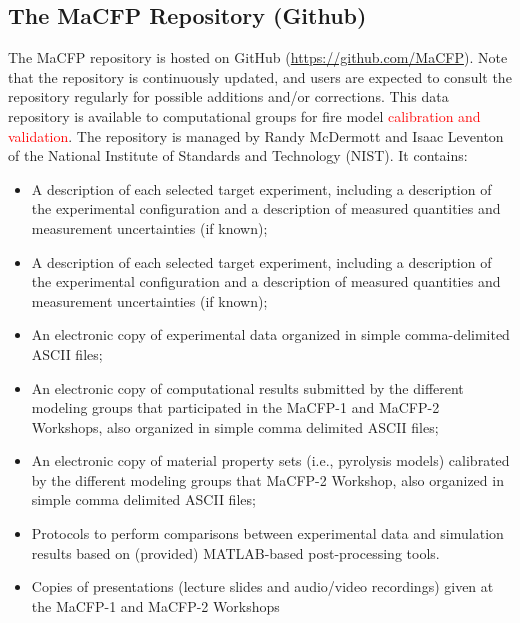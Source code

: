 \documentclass[12pt]{article}
\begin{document}
\subsection{The MaCFP Repository (Github)}
The MaCFP repository is hosted on GitHub (\url{https://github.com/MaCFP}). Note that the repository is continuously updated, and users are expected to consult the repository regularly for possible additions and/or corrections. This data repository is available to computational groups for fire model \textcolor{red}{calibration and validation}. The repository is managed by Randy McDermott and Isaac Leventon of the National Institute of Standards and Technology (NIST). It contains: 
\begin{itemize}[noitemsep]
 \item A description of each selected target experiment, including a description of the experimental configuration and a description of measured quantities and measurement uncertainties (if known); 
  \item A description of each selected target experiment, including a description of the experimental configuration and a description of measured quantities and measurement uncertainties (if known);  
 \item An electronic copy of experimental data organized in simple comma-delimited ASCII files; 
 \item An electronic copy of computational results submitted by the different modeling groups that participated in the MaCFP-1 and MaCFP-2 Workshops, also organized in simple comma delimited ASCII files; 
  \item An electronic copy of material property sets (i.e., pyrolysis models) calibrated by the different modeling groups that MaCFP-2 Workshop, also organized in simple comma delimited ASCII files; 
 \item Protocols to perform comparisons between experimental data and simulation results based on (provided) MATLAB-based post-processing tools. 
 \item Copies of presentations (lecture slides and audio/video recordings) given at the MaCFP-1 and MaCFP-2 Workshops
\end{itemize}
\end{document}
